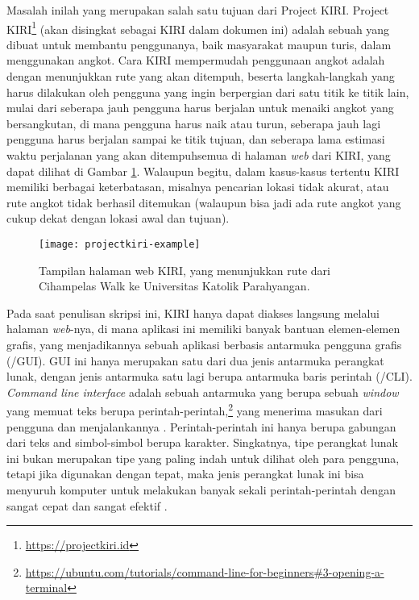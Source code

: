 Masalah inilah yang merupakan salah satu tujuan dari Project KIRI. Project KIRI\footnote{\href{https://projectkiri.id}{https://projectkiri.id}} (akan disingkat sebagai KIRI dalam dokumen ini) adalah sebuah \websoftware\xspace yang dibuat untuk membantu penggunanya, baik masyarakat maupun turis, dalam menggunakan angkot. Cara KIRI mempermudah penggunaan angkot adalah dengan menunjukkan rute yang akan ditempuh, beserta langkah-langkah yang harus dilakukan oleh pengguna yang ingin berpergian dari satu titik ke titik lain, mulai dari seberapa jauh pengguna harus berjalan untuk menaiki angkot yang bersangkutan, di mana pengguna harus naik atau turun, seberapa jauh lagi pengguna harus berjalan sampai ke titik tujuan, dan seberapa lama estimasi waktu perjalanan yang akan ditempuh\textemdash semua di halaman \textit{web} dari KIRI, yang dapat dilihat di Gambar \ref{fig:kiri-page}. Walaupun begitu, dalam kasus-kasus tertentu KIRI memiliki berbagai keterbatasan, misalnya pencarian lokasi tidak akurat, atau rute angkot tidak berhasil ditemukan (walaupun bisa jadi ada rute angkot yang cukup dekat dengan lokasi awal dan tujuan).

\begin{figure}[ht]
    \centering
    \texttt{[image: projectkiri-example]}
    \caption[Tampilan halaman web KIRI]{Tampilan halaman web KIRI, yang menunjukkan rute dari Cihampelas Walk ke Universitas Katolik Parahyangan.}
    \label{fig:kiri-page}
\end{figure}

Pada saat penulisan skripsi ini, KIRI hanya dapat diakses langsung melalui halaman \textit{web}-nya, di mana aplikasi ini memiliki banyak bantuan elemen-elemen grafis, yang menjadikannya sebuah aplikasi berbasis antarmuka pengguna grafis (\gui /GUI). GUI ini hanya merupakan satu dari dua jenis antarmuka perangkat lunak, dengan jenis antarmuka satu lagi berupa antarmuka baris perintah (\cli /CLI). \textit{Command line interface} adalah sebuah antarmuka yang berupa sebuah \textit{window} yang memuat teks berupa perintah-perintah,\footnote{\href{https://ubuntu.com/tutorials/command-line-for-beginners\#3-opening-a-terminal}{https://ubuntu.com/tutorials/command-line-for-beginners\#3-opening-a-terminal}} yang menerima masukan dari pengguna dan  menjalankannya \cite{marsh:2010:fatfreeintrotocommandline}. Perintah-perintah ini hanya berupa gabungan dari teks and simbol-simbol berupa karakter. Singkatnya, tipe perangkat lunak ini bukan merupakan tipe yang paling indah untuk dilihat oleh para pengguna, tetapi jika digunakan dengan tepat, maka \mbox{jenis} \mbox{perangkat} lunak ini bisa menyuruh komputer untuk melakukan banyak sekali perintah-perintah dengan sangat cepat dan sangat efektif \cite{shottsjr:2019:linuxcommandline}.

